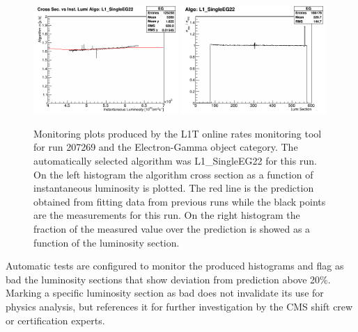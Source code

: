 \begin{figure}[!htb]
\centering
\includegraphics[width=0.49\textwidth]{Chapter03/L1TOnline/Images/L1TDQM_Online_Run207269_L1TRate_TriggerCrossSections_EG.png}
\includegraphics[width=0.49\textwidth]{Chapter03/L1TOnline/Images/L1TDQM_Online_Run207269_L1TRate_Certification_EG.png}
\caption{Monitoring plots produced by the \gls{L1T} online rates monitoring tool for run 207269 and the Electron-Gamma object category. The automatically selected algorithm was L1\_SingleEG22 for this run. On the left histogram  the algorithm cross section as a function of instantaneous luminosity is plotted. The red line is the prediction obtained from fitting data from previous runs while the black points are the measurements for this run. On the right histogram the fraction of the measured value over the prediction is showed as a function of the luminosity section.}
\label{FIGURE:TechnicalWork_RateMonitoring}
\end{figure}

Automatic tests are configured to monitor the produced histograms and flag as bad the luminosity sections that show deviation from prediction above 20\%. Marking a specific luminosity section as bad does not invalidate its use for physics analysis, but references it for further investigation by the \gls{CMS} shift crew or certification experts.

